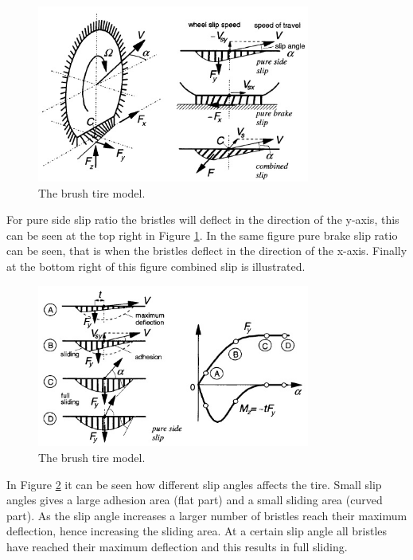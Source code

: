 \begin{figure}[h]
	\centering
	\includegraphics[width=0.8\textwidth]{Pictures/brush1}
	\caption{The brush tire model. \cite{pacejka}}
	\label{brush1}
\end{figure}

For pure side slip ratio the bristles will deflect in the direction of the y-axis, this can be seen at the top right in Figure \ref{brush1}. In the same figure pure brake slip ratio can be seen, that is when the bristles deflect in the direction of the x-axis. Finally at the bottom right of this figure combined slip is illustrated.

\begin{figure}[h]
	\centering
	\includegraphics[width=0.8\textwidth]{Pictures/brush2}
	\caption{The brush tire model. \cite{pacejka}}
	\label{brush2}
\end{figure}

In Figure \ref{brush2} it can be seen how different slip angles affects the tire. Small slip angles gives a large adhesion area (flat part) and a small sliding area (curved part). As the slip angle increases a larger number of bristles reach their maximum deflection, hence increasing the sliding area. At a certain slip angle all bristles have reached their maximum deflection and this results in full sliding. 

